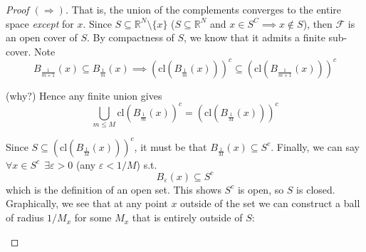 \documentclass{article}
\newcommand{\cl}{\text{cl}}
\theoremstyle{mythm}
\theoremstyle{mydef}
\begin{document}
\begin{proof}[\textit{Proof} $(\Rightarrow)$]
  That is, the union of the complements converges to the entire space \textit{except} for $x$. Since $S \subseteq \mathbb{R}^N \setminus \{x\}$ ($S \subseteq \mathbb{R}^N$ and $x \in S^C \implies x \notin S$), then $\mathcal{F}$ is an open cover of $S$. By compactness of $S$, we know that it admits a finite sub-cover. Note
  \[
    B_{\frac{1}{m + 1}}(x) \subseteq B_{\frac{1}{m}}(x)
    \implies
    \left(\cl(B_{\frac{1}{m}}(x))\right)^c \subseteq \left(\cl(B_{\frac{1}{m + 1}}(x))\right)^c
  \]

  (why?) Hence any finite union gives
  \[
    \bigcup_{m \le M} \cl\left(B_{\frac{1}{m}}(x)\right)^c =  \left(\cl(B_{\frac{1}{M}}(x))\right)^c
  \]

  Since $S \subseteq \left(\cl(B_{\frac{1}{M}}(x))\right)^c$, it must be that $B_{\frac{1}{M}}(x) \subseteq S^c$. Finally, we can say $\forall x \in S^c ~~ \exists \varepsilon > 0$ (any $\varepsilon < 1/M$) s.t.
  \[
    B_\varepsilon(x) \subseteq S^c
  \]
  which is the definition of an open set. This shows $S^c$ is open, so $S$ is closed. Graphically, we see that at any point $x$ outside of the set we can construct a ball of radius $1 / M_x$ for some $M_x$ that is entirely outside of $S$:
  \begin{figure}[H]
    \centering
  \end{figure}
\end{proof}
\end{document}
